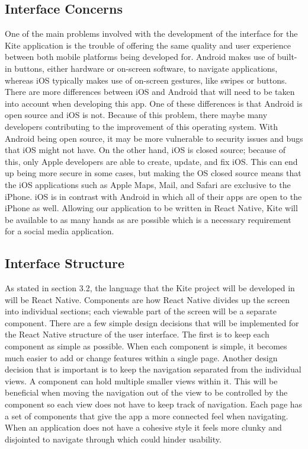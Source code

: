 \documentclass[compsoc, 10, draftclsnofoot, onecolumn]{IEEEtran}
\begin{document}
\subsection{Interface Concerns} One of the main problems involved with the development of the interface for the Kite application is the trouble of offering the same quality and user experience between both mobile platforms being developed for. Android makes use of built-in buttons, either hardware or on-screen software, to navigate applications, whereas iOS typically makes use of on-screen gestures, like swipes or buttons. There are more differences between iOS and Android that will need to be taken into account when developing this app. One of these differences is that Android is open source and iOS is not. Because of this problem, there maybe many developers contributing to the improvement of this operating system. With Android being open source, it may be more vulnerable to security issues and bugs that iOS might not have. On the other hand, iOS is closed source; because of this, only Apple developers are able to create, update, and fix iOS. This can end up being more secure in some cases, but making the OS closed source means that the iOS applications such as Apple Maps, Mail, and Safari are exclusive to the iPhone. iOS is in contrast with Android in which all of their apps are open to the iPhone as well. Allowing our application to be written in React Native, Kite will be available to as many hands as are possible which is a necessary requirement for a social media application.     

\subsection{Interface Structure}
As stated in section 3.2, the language that the Kite project will be developed in will be React Native. Components are how React Native divides up the screen into individual sections; each viewable part of the screen will be a separate component. There are a few simple design decisions that will be implemented for the React Native structure of the user interface. The first is to keep each component as simple as possible. When each component is simple, it becomes much easier to add or change features within a single page. Another design decision that is important is to keep the navigation separated from the individual views. A component can hold multiple smaller views within it. This will be beneficial when moving the navigation out of the view to be controlled by the component so each view does not have to keep track of navigation. Each page has a set of components that give the app a more connected feel when navigating. When an application does not have a cohesive style it feels more clunky and disjointed to navigate through which could hinder usability.
\end{document}
